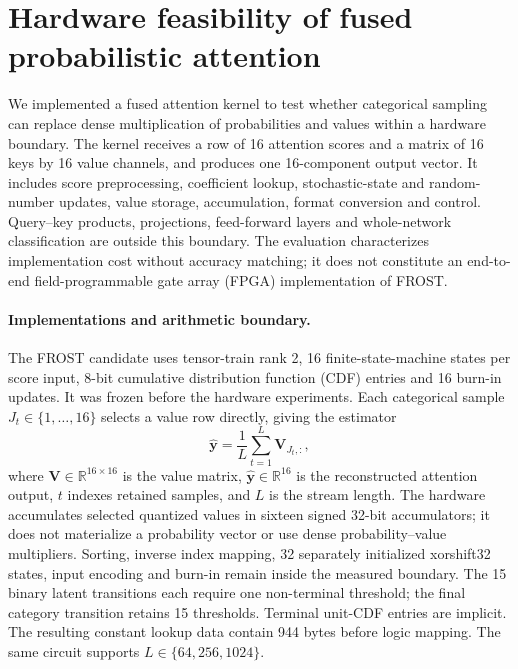 \section{Hardware feasibility of fused probabilistic attention}
\label{sec:fpga_evaluation}

We implemented a fused attention kernel to test whether categorical sampling
can replace dense multiplication of probabilities and values within a hardware
boundary. The kernel receives a row of 16 attention scores and a matrix of
16 keys by 16 value channels, and produces one 16-component output vector.
It includes score preprocessing, coefficient lookup, stochastic-state and
random-number updates, value storage, accumulation, format conversion and
control. Query--key products, projections, feed-forward layers and
whole-network classification are outside this boundary. The evaluation
characterizes implementation cost without accuracy matching; it does not
constitute an end-to-end field-programmable gate array (FPGA)
implementation of FROST.

\paragraph{Implementations and arithmetic boundary.}
The FROST candidate uses tensor-train rank 2, 16 finite-state-machine states
per score input, 8-bit cumulative distribution function (CDF) entries and
16 burn-in updates. It was frozen before the hardware experiments.
Each categorical sample $J_t\in\{1,\ldots,16\}$ selects a value row directly,
giving the estimator
\begin{equation}
\widehat{\boldsymbol y}=\frac{1}{L}\sum_{t=1}^{L}\boldsymbol V_{J_t,:},
\label{eq:fused_categorical_attention}
\end{equation}
where $\boldsymbol V\in\mathbb{R}^{16\times16}$ is the value matrix,
$\widehat{\boldsymbol y}\in\mathbb{R}^{16}$ is the reconstructed attention
output, $t$ indexes retained samples, and $L$ is the stream length.
The hardware accumulates selected quantized values in sixteen signed
32-bit accumulators; it does not materialize a probability vector or use
dense probability--value multipliers. Sorting, inverse index mapping,
32 separately initialized xorshift32 states, input encoding and burn-in
remain inside the measured boundary. The 15 binary latent transitions each require one non-terminal
threshold; the final category transition retains 15 thresholds.
Terminal unit-CDF entries are implicit. The
resulting constant lookup data contain 944 bytes before logic mapping.
The same circuit supports $L\in\{64,256,1024\}$.

